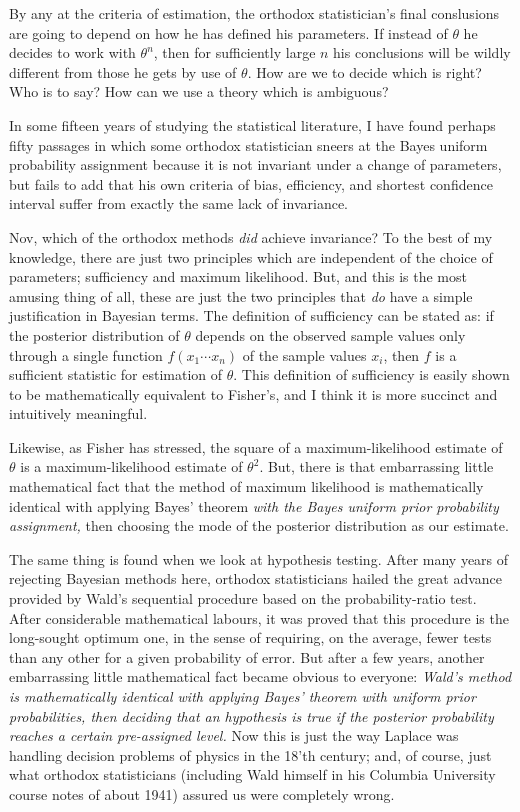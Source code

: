 \documentclass[12pt]{article}
\begin{document}
By any at the criteria of estimation, the orthodox statistician's final conslusions are going to depend on how he has defined his parameters. If instead of $\theta$ he decides to work with $\theta^n$, then for sufficiently large $n$ his conclusions will be wildly different from those he gets by use of $\theta$. How are we to decide which is right? Who is to say? How
can we use a theory which is ambiguous?

In some fifteen years of studying the statistical literature, I have found perhaps fifty passages in which some orthodox statistician sneers at the Bayes uniform probability assignment because it is not invariant under a change of parameters, but fails to add that his own criteria of bias, efficiency, and shortest confidence interval suffer from exactly the same lack of invariance.

Nov, which of the orthodox methods \emph{did} achieve invariance? To the best of my knowledge, there are just two principles which are independent of the choice of parameters; sufficiency and maximum likelihood. But, and this is the most amusing thing of all, these are just the two principles that \emph{do} have a simple justification in Bayesian terms. The definition of sufficiency can be stated as: if the posterior distribution of $\theta$ depends on the observed sample values only through a single function $f(x_1 \cdots x_n)$ of the sample values $x_i$, then $f$ is a sufficient statistic for estimation of $\theta$. This definition of
sufficiency is easily shown to be mathematically equivalent to Fisher's, and I think it is more succinct and intuitively meaningful.

Likewise, as Fisher has stressed, the square of a maximum-likelihood estimate of $\theta$ is a maximum-likelihood estimate of $\theta^2$. But, there is that embarrassing little mathematical fact that the method of maximum likelihood is mathematically identical with applying Bayes' theorem \emph{with the Bayes uniform prior probability assignment,} then choosing the mode of the posterior distribution as our estimate.

The same thing is found when we look at hypothesis testing. After many years of rejecting Bayesian methods here, orthodox statisticians hailed the great advance provided by Wald's sequential procedure based on the probability-ratio test. After considerable mathematical labours, it was proved that this procedure is the long-sought optimum one, in the sense of requiring, on the average, fewer tests than any other for a given probability of error. But after a few years, another embarrassing little mathematical fact became obvious to everyone: \emph{Wald's method is mathematically identical with applying Bayes' theorem with uniform prior probabilities, then deciding that an hypothesis is true if the posterior probability reaches a certain pre-assigned level.} Now this is just the way Laplace was handling decision problems of physics in the 18'th century; and, of course, just what orthodox statisticians (including Wald himself in his Columbia University course notes of about 1941) assured us were completely wrong.
\end{document}
